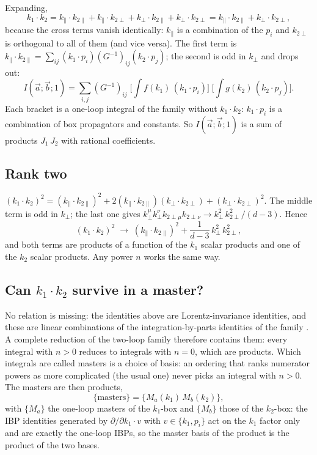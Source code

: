 \documentclass[11pt,a4paper]{article}
\newcommand{\kpar}{k_{\parallel}}
\newcommand{\kperp}{k_{\perp}}
\begin{document}
Expanding,
\begin{equation}
k_1\cdot k_2=\kpar\cdot k_{2\parallel}+\kpar\cdot k_{2\perp}+\kperp\cdot k_{2\parallel}+\kperp\cdot k_{2\perp}
=\kpar\cdot k_{2\parallel}+\kperp\cdot k_{2\perp},
\end{equation}
because the cross terms vanish identically: $\kpar$ is a combination of the $p_i$ and $k_{2\perp}$ is orthogonal to
all of them (and vice versa). The first term is
$\kpar\cdot k_{2\parallel}=\sum_{ij}(k_1\cdot p_i)(G^{-1})_{ij}(k_2\cdot p_j)$; the second is odd in $\kperp$ and drops
out:
\begin{equation}
I(\vec a;\vec b;1)=\sum_{i,j}(G^{-1})_{ij}\;
\Big[\int f(k_1)\,(k_1\cdot p_i)\Big]\;\Big[\int g(k_2)\,(k_2\cdot p_j)\Big].
\end{equation}
Each bracket is a one-loop integral of the family without $k_1\cdot k_2$: $k_1\cdot p_i$ is a combination of box
propagators and constants. So $I(\vec a;\vec b;1)$ is a sum of products $J_1\,J_2$ with rational coefficients.

\subsection{Rank two}

$(k_1\cdot k_2)^2=(\kpar\cdot k_{2\parallel})^2+2(\kpar\cdot k_{2\parallel})(\kperp\cdot k_{2\perp})
+(\kperp\cdot k_{2\perp})^2$. The middle term is odd in $\kperp$; the last one gives
$\kperp^\mu\kperp^\nu k_{2\perp\mu}k_{2\perp\nu}\to\kperp^2\,k_{2\perp}^2/(d-3)$. Hence
\begin{equation}
(k_1\cdot k_2)^2\;\to\;(\kpar\cdot k_{2\parallel})^2+\frac{1}{d-3}\,\kperp^2\,k_{2\perp}^2 ,
\end{equation}
and both terms are products of a function of the $k_1$ scalar products and one of the $k_2$ scalar products.
Any power $n$ works the same way.

\subsection{Can $k_1\cdot k_2$ survive in a master?}

No relation is missing: the identities above are Lorentz-invariance identities, and these are linear combinations of
the integration-by-parts identities of the family \cite{Lee}. A complete reduction of the two-loop family therefore
contains them: every integral with $n>0$ reduces to integrals with $n=0$, which are products. Which integrals are
called masters is a choice of basis: an ordering that ranks numerator powers as more complicated (the usual one)
never picks an integral with $n>0$. The masters are then products,
\begin{equation}
\{\text{masters}\}=\{M_a(k_1)\,M_b(k_2)\},
\end{equation}
with $\{M_a\}$ the one-loop masters of the $k_1$-box and $\{M_b\}$ those of the $k_2$-box: the IBP identities
generated by $\partial/\partial k_1\cdot v$ with $v\in\{k_1,p_i\}$ act on the $k_1$ factor only and are exactly the
one-loop IBPs, so the master basis of the product is the product of the two bases.
\end{document}
